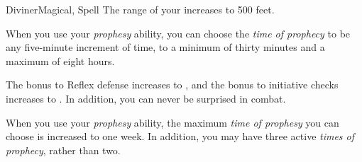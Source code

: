 \begin{feat}{Diviner}{Magical, Spell}
         The range of your  increases to 500 feet.

         When you use your \textit{prophesy} ability, you can choose the \textit{time of prophecy} to be any five-minute increment of time, to a minimum of thirty minutes and a maximum of eight hours.

         The bonus to Reflex defense increases to , and the bonus to initiative checks increases to .
        In addition, you can never be surprised in combat.

         When you use your \textit{prophesy} ability, the maximum \textit{time of prophesy} you can choose is increased to one week.
        In addition, you may have three active \textit{times of prophecy}, rather than two.
    \end{feat}

